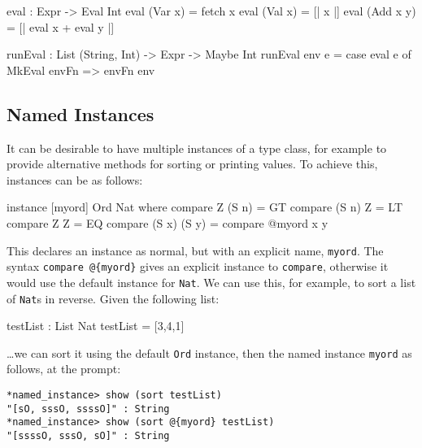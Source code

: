 \begin{code}
eval : Expr -> Eval Int
eval (Var x)   = fetch x
eval (Val x)   = [| x |]
eval (Add x y) = [| eval x + eval y |]
  
runEval : List (String, Int) -> Expr -> Maybe Int
runEval env e = case eval e of
    MkEval envFn => envFn env
\end{code} 

\subsection{Named Instances}

It can be desirable to have multiple instances of a type class, for example to provide alternative methods for sorting or printing values.
To achieve this, instances can be  as follows:

\begin{code}
instance [myord] Ord Nat where
   compare Z (S n)     = GT
   compare (S n) Z     = LT
   compare Z Z         = EQ
   compare (S x) (S y) = compare @{myord} x y
\end{code}

\noindent
This declares an instance as normal, but with an explicit name, \texttt{myord}.
The syntax \texttt{compare @\{myord\}} gives an explicit instance to \texttt{compare}, otherwise it would use the default instance for \texttt{Nat}.
We can use this, for example, to sort a list of \texttt{Nat}s in reverse.
Given the following list:

\begin{code}
testList : List Nat
testList = [3,4,1]
\end{code}

\noindent
\ldots we can sort it using the default \texttt{Ord} instance, then the named instance \texttt{myord} as follows, at the \Idris{} prompt:

\begin{lstlisting}[style=stdout]
*named_instance> show (sort testList)
"[sO, sssO, ssssO]" : String
*named_instance> show (sort @{myord} testList)
"[ssssO, sssO, sO]" : String
\end{lstlisting}

